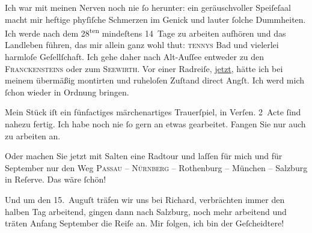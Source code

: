 \pstart
           Ich war mit meinen Nerven noch nie ſo herunter: ein geräuschvoller Speiſeſaal macht
               mir heftige phyſiſche Schmerzen im Genick und lauter ſolche Dummheiten. Ich werde
               nach dem 28\textsuperscript{ten} mindeſtens 14 Tage zu arbeiten aufhören {\pb}und das Landleben führen, das mir allein ganz wohl thut: \textsc{tennys} Bad und vielerlei harmloſe Geſellſchaft. Ich gehe daher nach Alt-Auſſee entweder zu den \textsc{Franckensteins} oder zum \textsc{Seewirth}. Vor einer Radreiſe, \uline{jetzt}, hätte ich bei
               meinem übermäßig montirten und ruheloſen Zuſtand direct Angſt. {\pb}Ich werd mich ſchon wieder in
               Ordnung bringen.\pend
           
\pstart
           Mein Stück iſt ein fünfactiges
               märchenartiges Trauerſpiel, in Verſen. 2 Acte ſind nahezu fertig. Ich habe noch nie
               ſo gern an etwas gearbeitet. Fangen Sie nur auch zu arbeiten an.\pend
           
\pstart
           Oder machen Sie jetzt mit Salten eine Radtour
                  {\pb}und laſſen für mich und für
                  September nur den Weg \textsc{Passau} – \textsc{Nürnberg} – Rothenburg – München – Salzburg in
               Reſerve. Das wäre ſchön!\pend
           
\pstart
           Und um den 15. Auguſt träfen wir uns bei Richard, verbrächten immer den halben Tag arbeitend, gingen
               dann {\pb}nach Salzburg, noch mehr arbeitend und träten Anfang
                  September die Reiſe an. Mir folgen, ich bin der Geſcheidtere!\pend
           
